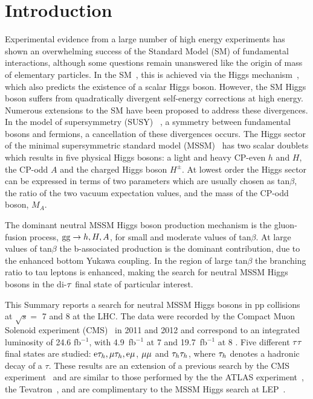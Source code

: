 \section{Introduction}
Experimental evidence from a large number of high energy experiments has shown an 
overwhelming success of the Standard Model (SM) of fundamental interactions, although 
some questions remain unanswered like the origin of mass of elementary particles. In 
the SM~\cite{SM1,SM2,SM3}, this is achieved via the Higgs 
mechanism~\cite{Englert:1964et,Higgs:1964ia,Higgs:1964pj,Guralnik:1964eu,Higgs:1966ev,Kibble:1967sv}, 
which also predicts the existence of a scalar Higgs boson. However, the SM Higgs boson 
suffers from quadratically divergent self-energy corrections at high energy. Numerous 
extensions to the SM have been proposed to address these divergences. In the model of 
supersymmetry (SUSY)~\cite{Golfand:1971iw,Wess:1974tw} , a symmetry between fundamental 
bosons and fermions, a cancellation of these divergences occurs. The Higgs sector of the 
minimal supersymmetric standard model (MSSM)~\cite{fayet1,fayet2} has two scalar doublets 
which results in five physical Higgs bosons: a light and heavy CP-even $h$ and $H$, the 
CP-odd $A$ and the charged Higgs boson $H^{\pm}$. At lowest order the Higgs sector can 
be expressed in terms of two parameters which are usually chosen as tan$\beta$, the 
ratio of the two vacuum expectation values, and the mass of the CP-odd boson, $M_A$. 

The dominant neutral MSSM Higgs boson production mechanism is the gluon-fusion process, 
$\mathrm{g}\mathrm{g} \to h, H, A$, for small and moderate values of tan$\beta$. At large values of tan$\beta$ 
the b-associated production is the dominant contribution, due to the enhanced bottom Yukawa 
coupling. In the region of large tan$\beta$ the branching ratio to tau leptons is enhanced, 
making the search for neutral MSSM Higgs bosons in the di-$\mathrm{\tau}$ final state of particular interest. 

This Summary reports a search for neutral MSSM Higgs bosons in pp collisions at $\sqrt{s}=$ 7 \TeV 
and 8 \TeV at the LHC. The data were recorded by the Compact Muon Solenoid experiment (CMS)~\cite{CMS-JINST} 
in 2011 and 2012 and correspond to an integrated luminosity of 24.6 fb$^{-1}$, with 4.9~fb$^{-1}$ 
at 7 \TeV and 19.7~fb$^{-1}$ at 8 \TeV. Five different $\mathrm{\tau}\mathrm{\tau}$ final states are studied: 
$\mathrm{e}\mathrm{\tau}_{h}, \mathrm{\mu}\mathrm{\tau}_{h}, \mathrm{e}\mathrm{\mu}$, $\mathrm{\mu}\mathrm{\mu}$ and $\mathrm{\tau}_{h}\mathrm{\tau}_{h}$, where $\mathrm{\tau}_{h}$ denotes a 
hadronic decay of a $\tau$. These results are an extension of a previous search by the CMS 
experiment~\cite{CMS-PAPER-HIG-10-002} and are similar to those performed by the the ATLAS 
experiment~\cite{Atlas-MSSM}, the Tevatron~\cite{Tevatron-MSSM, D0-MSSM, CDF-MSSM}, and are 
complimentary to the MSSM Higgs search at LEP~\cite{LEP2-MSSM}. 

